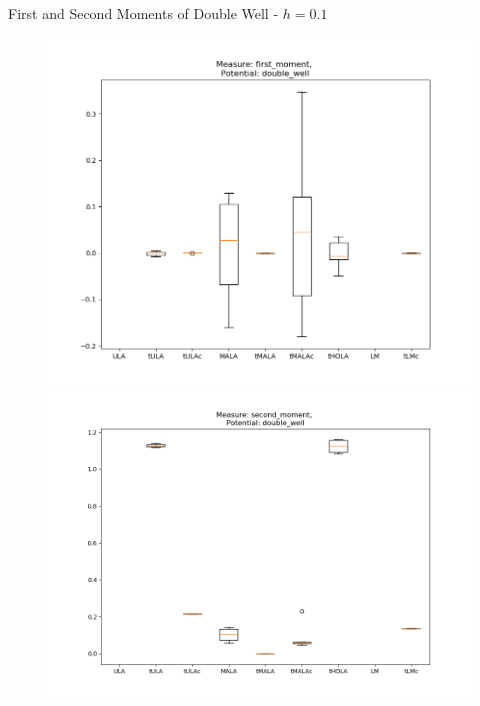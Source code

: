 \documentclass[aspectratio=169]{beamer}
\begin{document}
\begin{frame}{First and Second Moments of Double Well - \(h=0.1\)}%
        \begin{figure}[h]
        \centering
        \begin{minipage}{0.5\linewidth}
          \centering
          \includegraphics[width=0.99\linewidth]{10sBoxPlot1moment100dim01step.png}
        \end{minipage}%
        \begin{minipage}{0.5\linewidth}
          \centering
          \includegraphics[width=0.99\linewidth]{10sBoxPlot2moment100dim01step.png}
        \end{minipage}%
        \end{figure}
\end{frame}
\end{document}
